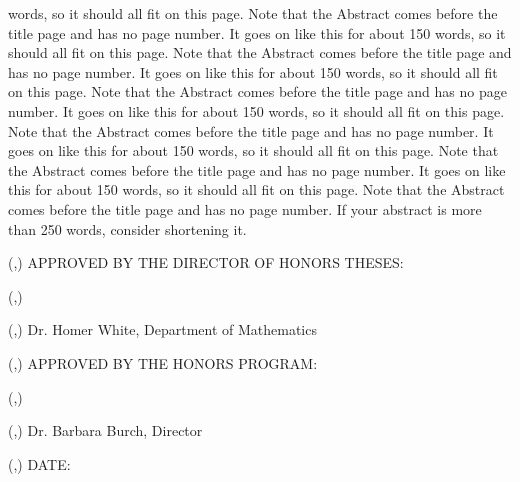 \documentclass[
  letterpaper,
]{scrreprt}
\theoremstyle{remark}
\begin{document}
\begin{titlepage}
\begin{textblock*}{\textwidth}
words, so it should all fit on this page. Note that the Abstract comes before the title page and has
no page number. It goes on like this for about 150 words, so it should all fit on this page. Note
that the Abstract comes before the title page and has no page number. It goes on like this for
about 150 words, so it should all fit on this page. Note that the Abstract comes before the title
page and has no page number. It goes on like this for about 150 words, so it should all fit on this
page. Note that the Abstract comes before the title page and has no page number. It goes on like
this for about 150 words, so it should all fit on this page. Note that the Abstract comes before the
title page and has no page number. It goes on like this for about 150 words, so it should all fit on
this page. Note that the Abstract comes before the title page and has no page number. If your
abstract is more than 250 words, consider shortening it.
\end{textblock*}
\pagebreak
\thispagestyle{empty}
\begin{textblock*}{\paperwidth}(\fromleft{2in},\fromtop{144pt})
APPROVED BY THE DIRECTOR OF HONORS THESES:
\end{textblock*}
\begin{textblock*}{\paperwidth}(\fromleft{3in},\fromtop{192pt})
\underline{\hspace{4.5in}}
\end{textblock*}
\begin{textblock*}{\paperwidth}(\fromleft{3in},\fromtop{216pt})
Dr. Homer White, Department of Mathematics
\end{textblock*}
\begin{textblock*}{\paperwidth}(\fromleft{2in},\fromtop{396pt})
APPROVED BY THE HONORS PROGRAM:
\end{textblock*}
\begin{textblock*}{\paperwidth}(\fromleft{2in},\fromtop{444pt})
\underline{\hspace{4.5in}}
\end{textblock*}
\begin{textblock*}{\paperwidth}(\fromleft{2in},\fromtop{468pt})
Dr. Barbara Burch, Director
\end{textblock*}
\begin{textblock*}{\paperwidth}(\fromleft{1.5in},\fromtop{612pt})
DATE:\underline{\hspace{2in}}
\end{textblock*}
\end{titlepage}%
\theoremstyle{plain}
\newtheorem*{thm}{Theorem}
\newcommand{\thmnm}{Theorem}
\newtheorem*{namedthm}{\thmnm}
\theoremstyle{definition}
\newtheorem*{dfn}{Definition}
\newcommand{\defnm}{Definition}
\newtheorem*{nameddfn}{\defnm}
\end{document}
